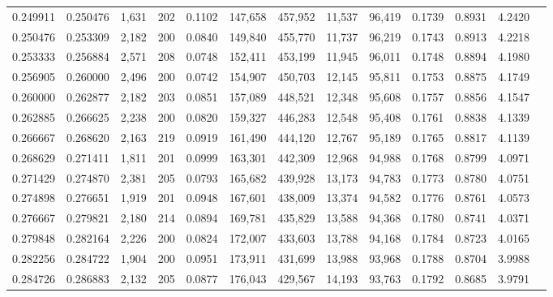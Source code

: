 \begin{tabular}{rrrrrrrrrrrrr}
0.249911 & 0.250476 &  1,631 &   202 &                                     0.1102 & 147,658 & 457,952 &  11,537 &  96,419 & 0.1739 & 0.8931 & 4.2420 \\
0.250476 & 0.253309 &  2,182 &   200 &                                     0.0840 & 149,840 & 455,770 &  11,737 &  96,219 & 0.1743 & 0.8913 & 4.2218 \\
0.253333 & 0.256884 &  2,571 &   208 &                                     0.0748 & 152,411 & 453,199 &  11,945 &  96,011 & 0.1748 & 0.8894 & 4.1980 \\
0.256905 & 0.260000 &  2,496 &   200 &                                     0.0742 & 154,907 & 450,703 &  12,145 &  95,811 & 0.1753 & 0.8875 & 4.1749 \\
0.260000 & 0.262877 &  2,182 &   203 &                                     0.0851 & 157,089 & 448,521 &  12,348 &  95,608 & 0.1757 & 0.8856 & 4.1547 \\
0.262885 & 0.266625 &  2,238 &   200 &                                     0.0820 & 159,327 & 446,283 &  12,548 &  95,408 & 0.1761 & 0.8838 & 4.1339 \\
0.266667 & 0.268620 &  2,163 &   219 &                                     0.0919 & 161,490 & 444,120 &  12,767 &  95,189 & 0.1765 & 0.8817 & 4.1139 \\
0.268629 & 0.271411 &  1,811 &   201 &                                     0.0999 & 163,301 & 442,309 &  12,968 &  94,988 & 0.1768 & 0.8799 & 4.0971 \\
0.271429 & 0.274870 &  2,381 &   205 &                                     0.0793 & 165,682 & 439,928 &  13,173 &  94,783 & 0.1773 & 0.8780 & 4.0751 \\
0.274898 & 0.276651 &  1,919 &   201 &                                     0.0948 & 167,601 & 438,009 &  13,374 &  94,582 & 0.1776 & 0.8761 & 4.0573 \\
0.276667 & 0.279821 &  2,180 &   214 &                                     0.0894 & 169,781 & 435,829 &  13,588 &  94,368 & 0.1780 & 0.8741 & 4.0371 \\
0.279848 & 0.282164 &  2,226 &   200 &                                     0.0824 & 172,007 & 433,603 &  13,788 &  94,168 & 0.1784 & 0.8723 & 4.0165 \\
0.282256 & 0.284722 &  1,904 &   200 &                                     0.0951 & 173,911 & 431,699 &  13,988 &  93,968 & 0.1788 & 0.8704 & 3.9988 \\
0.284726 & 0.286883 &  2,132 &   205 &                                     0.0877 & 176,043 & 429,567 &  14,193 &  93,763 & 0.1792 & 0.8685 & 3.9791 \\

\end{tabular}

